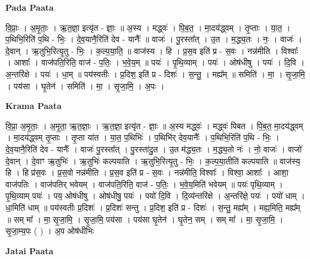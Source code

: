 \documentclass[17pt]{extarticle}
\begin{document}
\textbf{Pada Paata} \newline

वि॒प्राः॒ । अ॒मृ॒ताः॒ । ऋ॒त॒ज्ञा॒ इत्यृ॑त - ज्ञाः॒ ॥ अ॒स्य । मद्ध्वः॑ । पि॒ब॒त॒ । मा॒दय॑द्ध्वम् । तृ॒प्ताः । या॒त॒ । प॒थिभि॒रिति॑ प॒थि - भिः॒ । दे॒व॒यानै॒रिति॑ देव - यानैः᳚ ॥ वाजः॑ । पु॒रस्ता᳚त् । उ॒त । म॒द्ध्य॒तः । नः॒ । वाजः॑ । दे॒वान् । ऋ॒तुभि॒रित्यृ॒तु - भिः॒ । क॒ल्प॒या॒ति॒ ॥ वाज॑स्य । हि । प्र॒स॒व इति॑ प्र - स॒वः । नन्न॑मीति । विश्वाः᳚ । आशाः᳚ । वाज॑पति॒रिति॒ वाज॑ - प॒तिः॒ । भ॒वे॒य॒म् ॥ पयः॑ । पृ॒थि॒व्याम् । पयः॑ । ओष॑धीषु । पयः॑ । दि॒वि । अ॒न्तरि॑क्षे । पयः॑ । धा॒म् ॥ पय॑स्वतीः । प्र॒दिश॒ इति॑ प्र - दिशः॑ । स॒न्तु॒ । मह्य᳚म् ॥ समिति॑ । मा॒ । सृ॒जा॒मि॒ । पय॑सा । घृ॒तेन॑ । समिति॑ । मा॒ । सृ॒जा॒मि॒ । अ॒पः ।  \newline


\textbf{Krama Paata} \newline

वि॒प्रा॒ अ॒मृ॒ताः॒ । अ॒मृ॒ता॒ ऋ॒त॒ज्ञाः॒ । ऋ॒त॒ज्ञा॒ इत्यृ॑त - ज्ञाः॒ ॥ अ॒स्य मद्ध्वः॑ । मद्ध्वः॑ पिबत । पि॒ब॒त॒ मा॒दय॑द्ध्वम् । मा॒दय॑द्ध्वम् तृ॒प्ताः । तृ॒प्ता या॑त । या॒त॒ प॒थिभिः॑ । प॒थिभि॑र् देव॒यानैः᳚ । प॒थिभि॒रिति॑ प॒थि - भिः॒ । दे॒व॒यानै॒रिति॑ देव - यानैः᳚ । वाजः॑ पु॒रस्ता᳚त् । पु॒रस्ता॑दु॒त । उ॒त म॑द्ध्य॒तः । म॒द्ध्य॒तो नः॑ । नो॒ वाजः॑ । वाजो॑ दे॒वान् । दे॒वाꣳ ऋ॒तुभिः॑ । ऋ॒तुभिः॑ कल्पयाति । ऋ॒तुभि॒रित्यृ॒तु - भिः॒ । क॒ल्प॒या॒तीति॑ कल्पयाति ॥ वाज॑स्य॒ हि । हि प्र॑स॒वः । प्र॒स॒वो नन्न॑मीति । प्र॒स॒व इति॑ प्र - स॒वः । नन्न॑मीति॒ विश्वाः᳚ । विश्वा॒ आशाः᳚ । आशा॒ वाज॑पतिः । वाज॑पतिर् भवेयम् । वाज॑पति॒रिति॒ वाज॑ - प॒तिः॒ । भ॒वे॒य॒मिति॑ भवेयम् ॥ पयः॑ पृथि॒व्याम् । पृ॒थि॒व्याम् पयः॑ । पय॒ ओष॑धीषु । ओष॑धीषु॒ पयः॑ । पयो॑ दि॒वि । दि॒व्य॑न्तरि॑क्षे । अ॒न्तरि॑क्षे॒ पयः॑ । पयो॑ धाम् । धा॒मिति॑ धाम् ॥ पय॑स्वतीः प्र॒दिशः॑ । प्र॒दिशः॑ सन्तु । प्र॒दिश॒ इति॑ प्र - दिशः॑ । स॒न्तु॒ मह्य᳚म् । मह्य॒मिति॒ मह्य᳚म् ॥ सम् मा᳚ । मा॒ सृ॒जा॒मि॒ । सृ॒जा॒मि॒ पय॑सा । पय॑सा घृ॒तेन॑ । घृ॒तेन॒ सम् । सम् मा᳚ । मा॒ सृ॒जा॒मि॒ । सृ॒जा॒म्य॒पः ( ) । अ॒प ओष॑धीभिः \newline

\textbf{Jatai Paata} \newline
\end{document}
